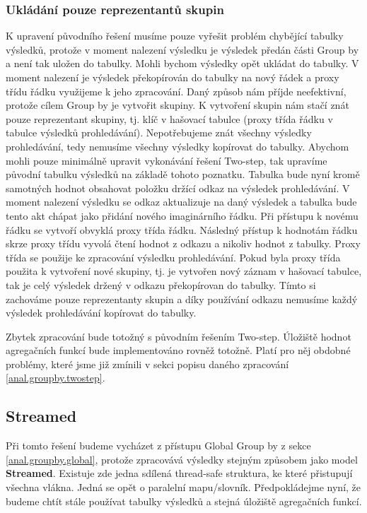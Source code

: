 \subsubsection{Ukládání pouze reprezentantů skupin} \label{anal.uprava.Groupby.table}

K upravení původního řešení musíme pouze vyřešit problém chybějící tabulky výsledků, protože v moment nalezení výsledku je výsledek předán části Group by a není tak uložen do tabulky.
Mohli bychom výsledky opět ukládat do tabulky.
V moment nalezení je výsledek překopírován do tabulky na nový řádek a proxy třídu řádku využijeme k jeho zpracování.
Daný způsob nám příjde neefektivní, protože cílem Group by je vytvořit skupiny. 
K vytvoření skupin nám stačí znát pouze reprezentant skupiny, tj. klíč v hašovací tabulce (proxy třída řádku v tabulce výsledků prohledávání).
Nepotřebujeme znát všechny výsledky prohledávání, tedy nemusíme všechny výsledky kopírovat do tabulky.
Abychom mohli pouze minimálně upravit vykonávání řešení Two-step, tak upravíme původní tabulku výsledků na základě tohoto poznatku.
Tabulka bude nyní kromě samotných hodnot obsahovat položku držící odkaz na výsledek prohledávání.
V moment nalezení výsledku se odkaz aktualizuje na daný výsledek a tabulka bude tento akt chápat jako přidání nového imaginárního řádku.
Při přístupu k novému řádku se vytvoří obvyklá proxy třída řádku.
Následný přístup k hodnotám řádku skrze proxy třídu vyvolá čtení hodnot z odkazu a nikoliv hodnot z tabulky.
Proxy třída se použije ke zpracování výsledku prohledávání.
Pokud byla proxy třída použita k vytvoření nové skupiny, tj. je vytvořen nový záznam v hašovací tabulce, tak je celý výsledek držený v odkazu překopírovan do tabulky.
Tímto si zachováme pouze reprezentanty skupin a díky používání odkazu nemusíme každý výsledek prohledávání kopírovat do tabulky.

\smallskip
Zbytek zpracování bude totožný s původním řešením Two-step.
Úložiště hodnot agregačních funkcí bude implementováno rovněž totožně.
Platí pro něj obdobné problémy, které jsme již zmínili v sekci popisu daného zpracování \ref{anal.groupby.twostep}. 


\subsection{Streamed}

Při tomto řešení budeme vycházet z přístupu Global Group by z sekce \ref{anal.groupby.global}, protože zpracovává výsledky stejným způsobem jako model \textbf{Streamed}.
Existuje zde jedna sdílená thread-safe struktura, ke které přistupují všechna vlákna.
Jedná se opět o paralelní mapu/slovník.
Předpokládejme nyní, že budeme chtít stále používat tabulky výsledků a stejná úložiště agregačních funkcí.

